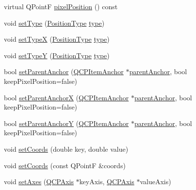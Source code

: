 \begin{DoxyCompactItemize}
\item 
virtual Q\+PointF \hyperlink{class_q_c_p_item_position_a247e99435d88ddd73c08fad3aebd4e8d}{pixel\+Position} () const 
\item 
void \hyperlink{class_q_c_p_item_position_aa476abf71ed8fa4c537457ebb1a754ad}{set\+Type} (\hyperlink{class_q_c_p_item_position_aad9936c22bf43e3d358552f6e86dbdc8}{Position\+Type} \hyperlink{class_q_c_p_item_position_aecb709d72c9aa334a7f62e2c9e0b5d60}{type})
\item 
void \hyperlink{class_q_c_p_item_position_a2113b2351d6d00457fb3559a4e20c3ea}{set\+TypeX} (\hyperlink{class_q_c_p_item_position_aad9936c22bf43e3d358552f6e86dbdc8}{Position\+Type} \hyperlink{class_q_c_p_item_position_aecb709d72c9aa334a7f62e2c9e0b5d60}{type})
\item 
void \hyperlink{class_q_c_p_item_position_ac2a454aa5a54c1615c50686601ec4510}{set\+TypeY} (\hyperlink{class_q_c_p_item_position_aad9936c22bf43e3d358552f6e86dbdc8}{Position\+Type} \hyperlink{class_q_c_p_item_position_aecb709d72c9aa334a7f62e2c9e0b5d60}{type})
\item 
bool \hyperlink{class_q_c_p_item_position_ac094d67a95d2dceafa0d50b9db3a7e51}{set\+Parent\+Anchor} (\hyperlink{class_q_c_p_item_anchor}{Q\+C\+P\+Item\+Anchor} $\ast$\hyperlink{class_q_c_p_item_position_a7b4ffab9946945c0e11cd2352dc2e042}{parent\+Anchor}, bool keep\+Pixel\+Position=false)
\item 
bool \hyperlink{class_q_c_p_item_position_add71461a973927c74e42179480916d9c}{set\+Parent\+AnchorX} (\hyperlink{class_q_c_p_item_anchor}{Q\+C\+P\+Item\+Anchor} $\ast$\hyperlink{class_q_c_p_item_position_a7b4ffab9946945c0e11cd2352dc2e042}{parent\+Anchor}, bool keep\+Pixel\+Position=false)
\item 
bool \hyperlink{class_q_c_p_item_position_add5ec1db9d19cec58a3b5c9e0a0c3f9d}{set\+Parent\+AnchorY} (\hyperlink{class_q_c_p_item_anchor}{Q\+C\+P\+Item\+Anchor} $\ast$\hyperlink{class_q_c_p_item_position_a7b4ffab9946945c0e11cd2352dc2e042}{parent\+Anchor}, bool keep\+Pixel\+Position=false)
\item 
void \hyperlink{class_q_c_p_item_position_aa988ba4e87ab684c9021017dcaba945f}{set\+Coords} (double key, double value)
\item 
void \hyperlink{class_q_c_p_item_position_acc70b3abc143287f806e5f154e5e07b0}{set\+Coords} (const Q\+PointF \&coords)
\item 
void \hyperlink{class_q_c_p_item_position_a2185f45c75ac8cb9be89daeaaad50e37}{set\+Axes} (\hyperlink{class_q_c_p_axis}{Q\+C\+P\+Axis} $\ast$key\+Axis, \hyperlink{class_q_c_p_axis}{Q\+C\+P\+Axis} $\ast$value\+Axis)

\end{DoxyCompactItemize}
